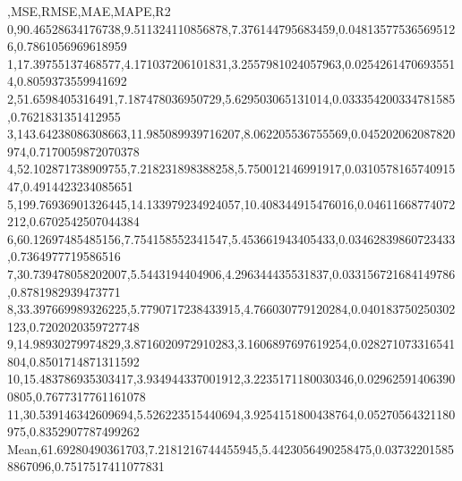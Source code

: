 ,MSE,RMSE,MAE,MAPE,R2
0,90.46528634176738,9.511324110856878,7.376144795683459,0.048135775365695126,0.7861056969618959
1,17.39755137468577,4.171037206101831,3.2557981024057963,0.02542614706935514,0.8059373559941692
2,51.6598405316491,7.187478036950729,5.629503065131014,0.033354200334781585,0.7621831351412955
3,143.64238086308663,11.985089939716207,8.062205536755569,0.045202062087820974,0.7170059872070378
4,52.102871738909755,7.218231898388258,5.750012146991917,0.031057816574091547,0.4914423234085651
5,199.76936901326445,14.133979234924057,10.408344915476016,0.04611668774072212,0.6702542507044384
6,60.12697485485156,7.754158552341547,5.453661943405433,0.03462839860723433,0.7364977719586516
7,30.739478058202007,5.5443194404906,4.296344435531837,0.033156721684149786,0.8781982939473771
8,33.397669989326225,5.7790717238433915,4.766030779120284,0.040183750250302123,0.7202020359727748
9,14.98930279974829,3.8716020972910283,3.1606897697619254,0.028271073316541804,0.8501714871311592
10,15.483786935303417,3.934944337001912,3.2235171180030346,0.029625914063900805,0.7677317761161078
11,30.539146342609694,5.526223515440694,3.9254151800438764,0.05270564321180975,0.8352907787499262
Mean,61.69280490361703,7.2181216744455945,5.4423056490258475,0.037322015858867096,0.7517517411077831
